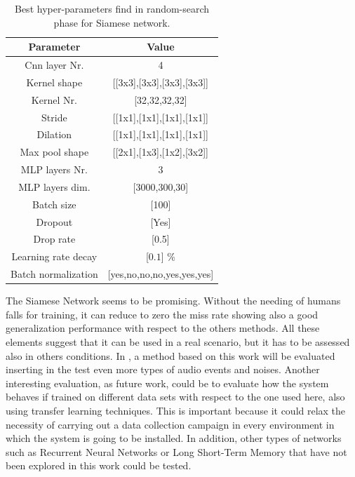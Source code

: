 \begin{table}[ht]
	\caption{Best hyper-parameters find in random-search phase for Siamese network\protect\footnotemark[6].}\label{tab:opt_hyperparam}
	\centering
	
	\begin{tabular} {c | c}
		\hline
		\textbf{Parameter} 		& \textbf{Value} \\  
		\hline
		Cnn layer Nr. 	& 4		                          \\
		\hline
		Kernel shape 	& [[3x3],[3x3],[3x3],[3x3]]     \\
		\hline									
		Kernel Nr. 		& [32,32,32,32]	                            \\
		\hline   
		Stride & [[1x1],[1x1],[1x1],[1x1]]			                          \\
		\hline
		Dilation & [[1x1],[1x1],[1x1],[1x1]]  \\
		\hline
		Max pool shape & [[2x1],[1x3],[1x2],[3x2]]     \\
		\hline                   
		MLP layers Nr. 	&	3	                          \\
		\hline
		MLP layers dim.	& [3000,300,30]                        \\
		\hline
		Batch size	&	[100]                                    						\\
		\hline 
		Dropout & [Yes]        \\
		\hline
		Drop rate	&	[0.5]                         \\
		\hline
		Learning rate decay	&	[$0.1$] \% \\
		\hline                
		Batch normalization	&	[yes,no,no,no,yes,yes,yes]                   \\
		\hline
		
	\end{tabular}
\end{table}


The Siamese Network seems to be promising. Without the needing of humans falls for training, it can reduce to zero the miss rate showing also a good generalization performance with respect to the others methods. All these elements suggest that it can be used in a real scenario, but it has to be assessed also in others conditions.
In , a method based on this work will be evaluated inserting in the test even more types of audio events and noises.
Another interesting evaluation, as future work, could be to evaluate how the system behaves if trained on different data sets with respect to the one used here, also using transfer learning techniques. This is important because it could relax the necessity of carrying out a data collection campaign in every environment in which the system is going to be installed. In addition, other types of networks such as Recurrent Neural Networks or Long Short-Term Memory that have not been explored in this work could be tested.




